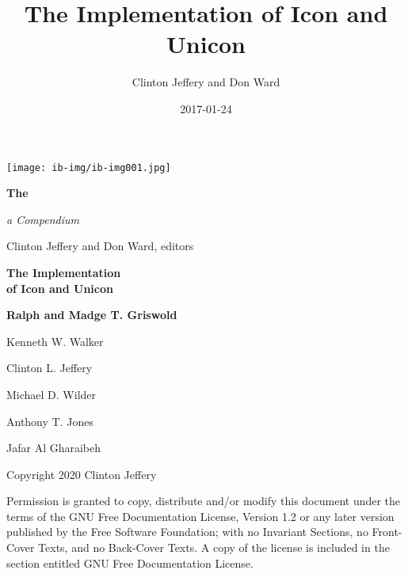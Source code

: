 \documentclass[letterpaper,twoside,12pt]{book}
\title{The Implementation of Icon and Unicon}
\author{Clinton Jeffery and Don Ward}
\date{2017-01-24}
\newcommand*{\TitleFont}{%
      \usefont{T1}{ptm}{b}{n}%
      \fontsize{50}{56}%
      \selectfont}
\begin{document}
\clearpage\clearpage\setcounter{page}{1}\pagestyle{KonvertFolgeii}
\thispagestyle{Konverti}
\begin{center}
\texttt{[image: ib-img/ib-img001.jpg]}
\end{center}
{\color{black}
\bfseries\Huge
The \vspace{0.05in}

\noindent \TitleFont
\begin{center}
\colorbox{blue}{\makebox[6.2in][r]{\parbox{6.2in}{\center\textcolor{white}{Implementation of\\ Icon and Unicon} \vspace{0.05in}}}}
\end{center}
}

\vspace{0.05in}

{\raggedleft\itshape\huge
a Compendium
\par}

\bigskip

{\raggedleft\LARGE
Clinton Jeffery and Don Ward, editors
\par}

\clearpage\setcounter{page}{1}\pagestyle{UnnumberedKonvertFolgeii}
\parbox{1in}{}

\clearpage

\bigskip
\bigskip
\bigskip

{\centering\bfseries\Huge
The Implementation\\
of Icon and Unicon
\par}

\bigskip
\bigskip
\bigskip
\bigskip
\bigskip
\bigskip
\bigskip

{\raggedleft\bfseries\Large
Ralph and Madge T. Griswold
\par
Kenneth W. Walker
\par
Clinton L. Jeffery 
\par
Michael D. Wilder
\par
Anthony T. Jones
\par
Jafar Al Gharaibeh
\par}

\bigskip
\bigskip
\bigskip

\clearpage\setcounter{page}{1}\pagestyle{KonvertFolgeii}
\frontmatter
\bigskip
\bigskip
\noindent Copyright {\textcopyright} 2020 Clinton Jeffery


\noindent Permission is granted to copy, distribute and/or modify this
document under the terms of the GNU Free Documentation License,
Version 1.2 or any later version published by the Free Software
Foundation; with no Invariant Sections, no Front-Cover Texts, and no
Back-Cover Texts. A copy of the license is included in the section
entitled {\textquotedbl}GNU Free Documentation License{\textquotedbl}.
\end{document}
